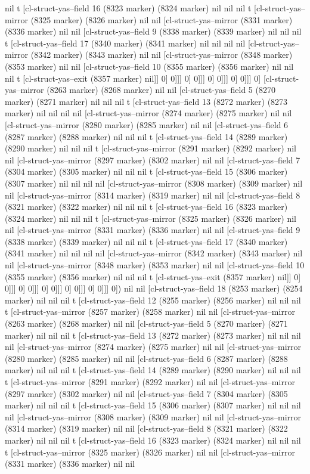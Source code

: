 {{nil t [cl-struct-yas--field 16 (8323 marker) (8324 marker) nil nil nil t [cl-struct-yas--mirror (8325 marker) (8326 marker) nil nil [cl-struct-yas--mirror (8331 marker) (8336 marker) nil nil [cl-struct-yas--field 9 (8338 marker) (8339 marker) nil nil nil t [cl-struct-yas--field 17 (8340 marker) (8341 marker) nil nil nil nil [cl-struct-yas--mirror (8342 marker) (8343 marker) nil nil [cl-struct-yas--mirror (8348 marker) (8353 marker) nil nil [cl-struct-yas--field 10 (8355 marker) (8356 marker) nil nil nil t [cl-struct-yas--exit (8357 marker) nil]] 0] 0]]] 0] 0]]] 0] 0]]] 0] 0]]] 0] [cl-struct-yas--mirror (8263 marker) (8268 marker) nil nil [cl-struct-yas--field 5 (8270 marker) (8271 marker) nil nil nil t [cl-struct-yas--field 13 (8272 marker) (8273 marker) nil nil nil nil [cl-struct-yas--mirror (8274 marker) (8275 marker) nil nil [cl-struct-yas--mirror (8280 marker) (8285 marker) nil nil [cl-struct-yas--field 6 (8287 marker) (8288 marker) nil nil nil t [cl-struct-yas--field 14 (8289 marker) (8290 marker) nil nil nil t [cl-struct-yas--mirror (8291 marker) (8292 marker) nil nil [cl-struct-yas--mirror (8297 marker) (8302 marker) nil nil [cl-struct-yas--field 7 (8304 marker) (8305 marker) nil nil nil t [cl-struct-yas--field 15 (8306 marker) (8307 marker) nil nil nil nil [cl-struct-yas--mirror (8308 marker) (8309 marker) nil nil [cl-struct-yas--mirror (8314 marker) (8319 marker) nil nil [cl-struct-yas--field 8 (8321 marker) (8322 marker) nil nil nil t [cl-struct-yas--field 16 (8323 marker) (8324 marker) nil nil nil t [cl-struct-yas--mirror (8325 marker) (8326 marker) nil nil [cl-struct-yas--mirror (8331 marker) (8336 marker) nil nil [cl-struct-yas--field 9 (8338 marker) (8339 marker) nil nil nil t [cl-struct-yas--field 17 (8340 marker) (8341 marker) nil nil nil nil [cl-struct-yas--mirror (8342 marker) (8343 marker) nil nil [cl-struct-yas--mirror (8348 marker) (8353 marker) nil nil [cl-struct-yas--field 10 (8355 marker) (8356 marker) nil nil nil t [cl-struct-yas--exit (8357 marker) nil]] 0] 0]]] 0] 0]]] 0] 0]]] 0] 0]]] 0] 0]]] 0]) nil nil [cl-struct-yas--field 18 (8253 marker) (8254 marker) nil nil nil t [cl-struct-yas--field 12 (8255 marker) (8256 marker) nil nil nil t [cl-struct-yas--mirror (8257 marker) (8258 marker) nil nil [cl-struct-yas--mirror (8263 marker) (8268 marker) nil nil [cl-struct-yas--field 5 (8270 marker) (8271 marker) nil nil nil t [cl-struct-yas--field 13 (8272 marker) (8273 marker) nil nil nil nil [cl-struct-yas--mirror (8274 marker) (8275 marker) nil nil [cl-struct-yas--mirror (8280 marker) (8285 marker) nil nil [cl-struct-yas--field 6 (8287 marker) (8288 marker) nil nil nil t [cl-struct-yas--field 14 (8289 marker) (8290 marker) nil nil nil t [cl-struct-yas--mirror (8291 marker) (8292 marker) nil nil [cl-struct-yas--mirror (8297 marker) (8302 marker) nil nil [cl-struct-yas--field 7 (8304 marker) (8305 marker) nil nil nil t [cl-struct-yas--field 15 (8306 marker) (8307 marker) nil nil nil nil [cl-struct-yas--mirror (8308 marker) (8309 marker) nil nil [cl-struct-yas--mirror (8314 marker) (8319 marker) nil nil [cl-struct-yas--field 8 (8321 marker) (8322 marker) nil nil nil t [cl-struct-yas--field 16 (8323 marker) (8324 marker) nil nil nil t [cl-struct-yas--mirror (8325 marker) (8326 marker) nil nil [cl-struct-yas--mirror (8331 marker) (8336 marker) nil nil }}
